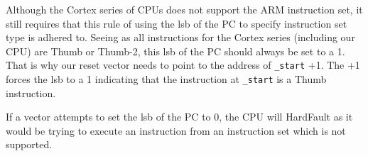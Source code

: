 Although the Cortex series of CPUs does not support the ARM instruction set, it still requires that this rule of using the lsb of the PC to specify instruction set type is adhered to. Seeing as all instructions for the Cortex series (including our CPU) are Thumb or Thumb-2, this lsb of the PC should always be set to a 1. That is why our reset vector needs to point to the address of \texttt{\_start} +1. The +1 forces the lsb to a 1 indicating that the instruction at \texttt{\_start} is a Thumb instruction. 

If a vector attempts to set the lsb of the PC to 0, the CPU will HardFault as it would be trying to execute an instruction from an instruction set which is not supported. 
